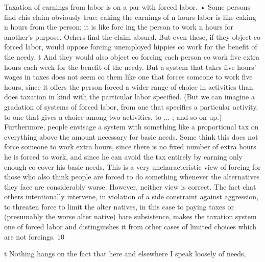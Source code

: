 \documentclass[11pt,openany]{book}
\begin{document}
Taxation of earnings from labor is on a par with forced labor. • Some persons find chis claim obviously true: caking the earnings of n hours labor is like caking n hours from the person; it is like forc ing the person to work n hours for another's purpose. Ochers find the claim absurd. But even these, if they object co forced labor, would oppose forcing unemployed hippies co work for the benefit of the needy. t And they would also object co forcing each person co work five extra hours each week for the benefit of the needy. But a system that takes five hours' wages in taxes does not seem co them like one that forces someone to work five hours, since it offers the person forced a wider range of choice in activities than does taxation in kind with the particular labor specified. (But we can imagine a gradation of systems of forced labor, from one that specifies a particular activity, to one that gives a choice among two activities, to ... ; and so on up.) Furthermore, people envisage a system with something like a proportional tax on everything above the amount necessary for basic needs. Some think this does not force someone to work extra hours, since there is no fixed number of extra hours he is forced to work, and since he can avoid the tax entirely by earning only enough co cover his basic needs. This is a very uncharacteristic view of forcing for those who also think people are forced to do something whenever the alternatives they face are considerably worse. However, neither view is correct. The fact chat others intentionally intervene, in violation of a side constraint against aggression, to threaten force to limit the alter natives, in this case to paying taxes or (presumably the worse alter native) bare subsistence, makes the taxation system one of forced labor and distinguishes it from other cases of limited choices which are not forcings. 10 

t Nothing hangs on the fact that here and elsewhere I speak loosely of needs, 
\end{document}
